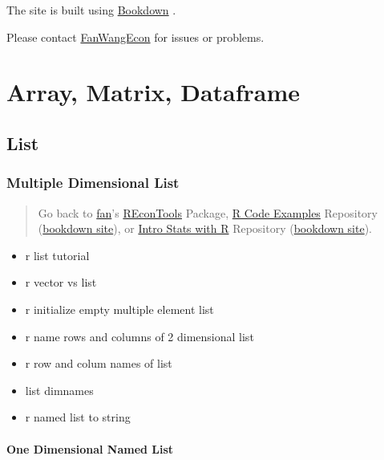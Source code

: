 \documentclass[
]{book}
\providecommand{\tightlist}{%
  \setlength{\itemsep}{0pt}\setlength{\parskip}{0pt}}
\begin{document}
The site is built using \href{https://bookdown.org/}{Bookdown} \citep{R-bookdown}.

Please contact \href{https://fanwangecon.github.io/}{FanWangEcon} for issues or problems.

\hypertarget{array-matrix-dataframe}{%
\chapter{Array, Matrix, Dataframe}\label{array-matrix-dataframe}}

\hypertarget{list}{%
\section{List}\label{list}}

\hypertarget{multiple-dimensional-list}{%
\subsection{Multiple Dimensional List}\label{multiple-dimensional-list}}

\begin{quote}
Go back to \href{http://fanwangecon.github.io/}{fan}'s \href{https://fanwangecon.github.io/REconTools/}{REconTools} Package, \href{https://fanwangecon.github.io/R4Econ/}{R Code Examples} Repository (\href{https://fanwangecon.github.io/R4Econ/bookdown}{bookdown site}), or \href{https://fanwangecon.github.io/Stat4Econ/}{Intro Stats with R} Repository (\href{https://fanwangecon.github.io/Stat4Econ/bookdown}{bookdown site}).
\end{quote}

\begin{itemize}
\tightlist
\item
  r list tutorial
\item
  r vector vs list
\item
  r initialize empty multiple element list
\item
  r name rows and columns of 2 dimensional list
\item
  r row and colum names of list
\item
  list dimnames
\item
  r named list to string
\end{itemize}

\hypertarget{one-dimensional-named-list}{%
\subsubsection{One Dimensional Named List}\label{one-dimensional-named-list}}
\end{document}

